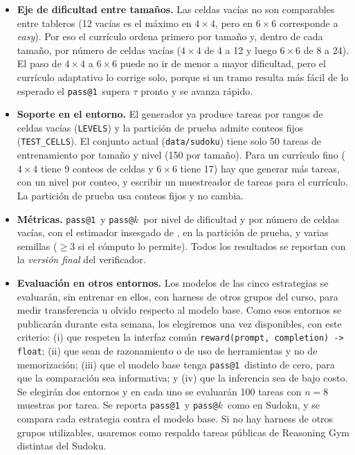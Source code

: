 \documentclass[letterpaper,11pt]{article}
\makeatletter
\newcommand{\passuno}{\texttt{pass@1}}
\newcommand{\passk}{\texttt{pass@}\ensuremath{k}}
\makeatother
\begin{document}
\begin{itemize}
  \item \textbf{Eje de dificultad entre tamaños.} Las celdas vacías no son comparables entre tableros (12 vacías es el máximo en $4\times4$, pero en $6\times6$ corresponde a \emph{easy}). Por eso el currículo ordena primero por tamaño y, dentro de cada tamaño, por número de celdas vacías ($4\times4$ de 4 a 12 y luego $6\times6$ de 8 a 24). El paso de $4\times4$ a $6\times6$ puede no ir de menor a mayor dificultad, pero el currículo adaptativo lo corrige solo, porque si un tramo resulta más fácil de lo esperado el \passuno\ supera $\tau$ pronto y se avanza rápido.
  \item \textbf{Soporte en el entorno.} El generador ya produce tareas por rangos de celdas vacías (\texttt{LEVELS}) y la partición de prueba admite conteos fijos (\texttt{TEST\_CELLS}). El conjunto actual (\texttt{data/sudoku}) tiene solo 50 tareas de entrenamiento por tamaño y nivel (150 por tamaño). Para un currículo fino ($4\times4$ tiene 9 conteos de celdas y $6\times6$ tiene 17) hay que generar más tareas, con un nivel por conteo, y escribir un muestreador de tareas para el currículo. La partición de prueba usa conteos fijos y no cambia.
  \item \textbf{Métricas.} \passuno\ y \passk\ por nivel de dificultad y por número de celdas vacías, con el estimador insesgado de \citet{chen2021codex}, en la partición de prueba, y varias semillas ($\geq 3$ si el cómputo lo permite). Todos los resultados se reportan con la \emph{versión final} del verificador.
  \item \textbf{Evaluación en otros entornos.} Los modelos de las cinco estrategias se evaluarán, sin entrenar en ellos, con harness de otros grupos del curso, para medir transferencia u olvido respecto al modelo base. Como esos entornos se publicarán durante esta semana, los elegiremos una vez disponibles, con este criterio: (i) que respeten la interfaz común \texttt{reward(prompt, completion) -> float}; (ii) que sean de razonamiento o de uso de herramientas y no de memorización; (iii) que el modelo base tenga \passuno\ distinto de cero, para que la comparación sea informativa; y (iv) que la inferencia sea de bajo costo. Se elegirán dos entornos y en cada uno se evaluarán 100 tareas con $n=8$ muestras por tarea. Se reporta \passuno\ y \passk\ como en Sudoku, y se compara cada estrategia contra el modelo base. Si no hay harness de otros grupos utilizables, usaremos como respaldo tareas públicas de Reasoning Gym \citep{stojanovski2025reasoninggym} distintas del Sudoku.

\end{itemize}
\end{document}
